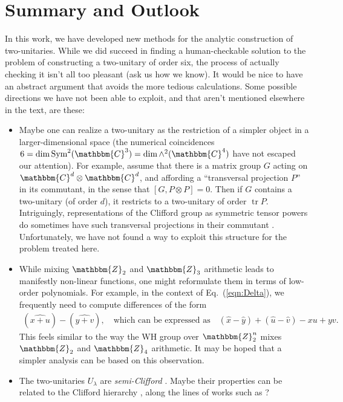 \documentclass[aps,nofootinbib,floatfix,a4paper]{revtex4}
\newcommand{\1}{\mbox{$\mathbf{1}$}}
\def\ZZ{\mathbbm{Z}}
\def\CC{\mathbbm{C}}
\DeclareMathOperator{\tr}{tr}
\DeclareMathOperator{\Sym}{Sym}
\begin{document}
\section{Summary and Outlook}

In this work, we have developed new methods for the analytic construction of two-unitaries.
While we did succeed in finding a human-checkable solution to the problem of constructing a two-unitary of order six,
the process of actually checking it isn't all too pleasant (ask us how we know).
It would be nice to have an abstract argument that avoids the more tedious calculations.
Some possible directions we have not been able to exploit, and that aren't mentioned elsewhere in the text, are these:
\begin{itemize}
	\item
		Maybe one can realize a two-unitary as the restriction of a simpler object in a larger-dimensional space
		(the numerical coincidences $6=\dim\Sym^2(\CC^3)=\dim \wedge^2(\CC^4)$ have not escaped our attention).
		For example, assume that there is a matrix group $G$ acting on $\CC^d\otimes\CC^d$, and affording a ``transversal projection $P$'' in its commutant, in the sense that $[G, P\otimes P]=0$.
		Then if $G$ contains a two-unitary (of order $d$), it restricts to a two-unitary of order $\tr P$.
		Intriguingly, representations of the Clifford group as symmetric tensor powers do sometimes have such transversal projections in their commutant \cite{gross2021schur,montealegre2021rank,montealegre2022duality}.
		Unfortunately, we have not found a way to exploit this structure for the problem treated here.

	\item
		While mixing $\ZZ_2$ and $\ZZ_3$ arithmetic leads to manifestly non-linear functions, 
		one might reformulate them in terms of low-order polynomials.
		For example, in the context of Eq.~(\ref{eqn:Delta}),
		we frequently need to compute differences of the form
		\begin{align*}
			(\widehat{x+u}) - (\widehat{y+v}),
			\quad\text{which can be expressed as}\quad
			(\hat x - \hat y)
			+
			(\hat u - \hat v)
			-xu + yv.
		\end{align*}
		This feels similar to the way the WH group over $\ZZ_2^n$ mixes $\ZZ_2$ and $\ZZ_4$ arithmetic.
		It may be hoped that a simpler analysis can be based on this observation.

	\item
		The two-unitaries $U_\lambda$ are \emph{semi-Clifford} \cite{zeng2008semi}.
		Maybe their properties can be related to the Clifford hierarchy
		\cite{gottesman1999demonstrating},
		along the lines of works such as \cite{beigi2008c3, rengaswamy2019unifying,chen2024characterising}?
\end{itemize}
\end{document}
